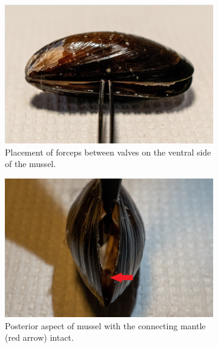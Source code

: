 \begin{figure}[t]
    \centering
    \begin{subfigure}[b]{.45\textwidth}
        \centering
        \includegraphics[width=\textwidth]{figures/Sampling technique/forceps square color.jpg}
        \caption{Placement of forceps between valves on the ventral side of the mussel.}
        \label{sfig:a}
    \end{subfigure}
    \hfill
    \begin{subfigure}[b]{.45\textwidth}
        \centering
        \includegraphics[width=\textwidth]{figures/Sampling technique/uncut color 3495.jpg}
        \caption{Posterior aspect of mussel with the connecting mantle (red arrow) intact.}
        \label{sfig:b}
    \end{subfigure}
    \newline
    \begin{subfigure}[b]{.45\textwidth}

\end{subfigure}
\end{figure}
